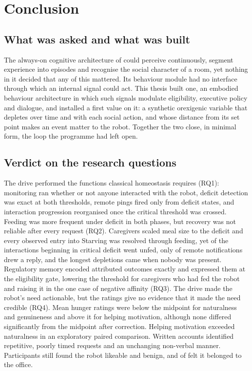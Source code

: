 \chapter{Conclusion}
\label{chap:conclusion}

\section{What was asked and what was built}
\label{sec:concl-summary}

The always-on cognitive architecture of \citet{Pasquali2025AlwaysOn,Pasquali2026ISEED} could perceive continuously, segment experience into episodes and recognise the social character of a room, yet nothing in it decided that any of this mattered. Its behaviour module had no interface through which an internal signal could act. This thesis built one, an embodied behaviour architecture in which such signals modulate eligibility, executive policy and dialogue, and installed a first value on it: a synthetic orexigenic variable that depletes over time and with each social action, and whose distance from its set point makes an event matter to the robot. Together the two close, in minimal form, the loop the programme had left open.

\section{Verdict on the research questions}
\label{sec:concl-questions}

The drive performed the functions classical homeostasis requires (RQ1): monitoring ran whether or not anyone interacted with the robot, deficit detection was exact at both thresholds, remote pings fired only from deficit states, and interaction progression reorganised once the critical threshold was crossed. Feeding was more frequent under deficit in both phases, but recovery was not reliable after every request (RQ2). Caregivers scaled meal size to the deficit and every observed entry into Starving was resolved through feeding, yet \CoreStarvingOnsetUnfed{} of the \CoreStarvingInteractions{} interactions beginning in critical deficit went unfed, only \CoreTelegramMessages{} of \CoreTelegramPings{} remote notifications drew a reply, and the longest depletions came when nobody was present. Regulatory memory encoded attributed outcomes exactly and expressed them at the eligibility gate, lowering the threshold for caregivers who had fed the robot and raising it in the one case of negative affinity (RQ3). The drive made the robot's need actionable, but the ratings give no evidence that it made the need credible (RQ4). Mean hunger ratings were below the midpoint for naturalness and genuineness and above it for helping motivation, although none differed significantly from the midpoint after correction. Helping motivation exceeded naturalness in an exploratory paired comparison. Written accounts identified repetitive, poorly timed requests and an unchanging non-verbal manner. Participants still found the robot likeable and benign, and \CoreCustomPartOfEnvironmentAgreement{} of \CoreCohortN{} felt it belonged to the office.

